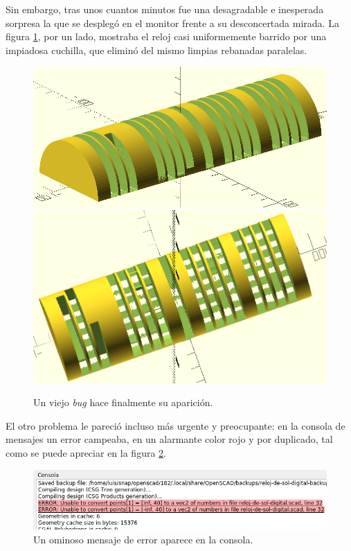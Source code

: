 Sin embargo, tras unos cuantos minutos fue una desagradable e
inesperada sorpresa la que se desplegó en el monitor frente a su
desconcertada mirada. La figura \ref{fig:reloj-bug-1-2}, por un lado,
mostraba el reloj casi uniformemente barrido por una impiadosa
cuchilla, que eliminó del mismo limpias rebanadas paralelas.


\begin{figure}[ht]
  \centering
  \includegraphics[width=.8\textwidth]{imagenes/reloj-bug-2}
  \includegraphics[width=.8\textwidth]{imagenes/reloj-bug-1}
  \caption{Un viejo \emph{bug} hace finalmente su aparición.}
  \label{fig:reloj-bug-1-2}
\end{figure}
  

El otro problema le pareció incluso más urgente y preocupante: en la
consola de mensajes un error campeaba, en un alarmante color rojo y
por duplicado, tal como se puede apreciar en la figura
\ref{fig:reloj-bug-consola}.

\begin{figure}[ht]
  \centering
  \includegraphics[width=1\textwidth]{imagenes/reloj-bug-consola}
  \caption{Un ominoso mensaje de error aparece en la consola.}
  \label{fig:reloj-bug-consola}
\end{figure}  


